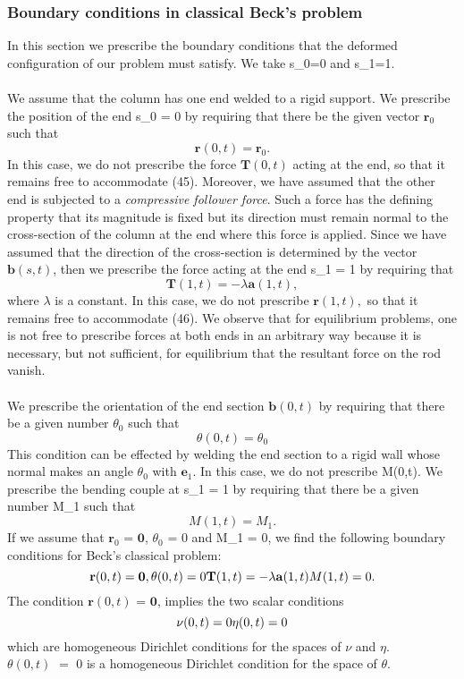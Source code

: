 
\subsubsection{Boundary conditions in classical Beck's problem}
In this section we prescribe the boundary conditions that the deformed configuration of our problem must satisfy. We take s_0=0 and s_1=1.\\\\
We assume that the column has one end welded to a rigid support. We prescribe the position of the end s_0 = 0 by requiring that there be the given vector $\mathbf{r}_0$ such that
\[ \mathbf{r}(0,t) = \mathbf{r}_0.\]
In this case, we do not prescribe the force $\mathbf{T}(0,t)$ acting at the end, so that it remains free to accommodate (45). Moreover, we have assumed that the other end is subjected to a \emph{compressive follower force}. Such a force has the defining property that its magnitude is fixed but its direction must remain normal to the cross-section of the column at the end where this force is applied. Since we have assumed that the direction of the cross-section is determined by the vector $\mathbf{b}(s,t)$, then we prescribe the force acting at the end s_1 = 1 by requiring that 
\[ \mathbf{T}(1,t) = -\lambda \mathbf{a}(1,t), \]
where $\lambda$ is a constant. In this case, we do not prescribe $\mathbf{r}(1,t),$ so that it remains free to accommodate (46). We observe that for equilibrium problems, one is not free to prescribe forces at both ends in an arbitrary way because it is necessary, but not sufficient, for equilibrium that the resultant force on the rod vanish.
\\\\
We prescribe the orientation of the end section $\mathbf{b}(0,t)$ by requiring that there be a given number $\theta_0$ such that
\[
\theta(0,t)=\theta_0
\]
This condition can be effected by welding the end section to a rigid wall whose normal makes an angle $\theta_0$ with $\mathbf{e}_1$. In this case, we do not prescribe M(0,t).
We prescribe the bending couple at s_1 = 1 by requiring that there be a given number M_1 such that
\[ M(1,t) = M_1.\]
If we assume that $\mathbf{r}_0$ = $\mathbf{0}$, $\theta_0$ = 0 and M_1 = 0, we find the following boundary conditions for Beck's classical problem:
\[ 
\mathbf{r}(0,t) = \mathbf{0},\\
\theta(0,t) = 0\\
\mathbf{T}(1,t) = -\lambda \mathbf{a}(1,t)\\
M(1,t) = 0.
\]
The condition $\mathbf{r}(0,t)$ = $\mathbf{0}$, implies the two scalar conditions
\[
\nu(0,t)= 0\\
\eta(0,t)= 0
\]
which are homogeneous Dirichlet conditions for the spaces of $\nu$ and $\eta$. $\theta(0,t)\,\,=\,\,0$ is a homogeneous Dirichlet condition for the space of $\theta$.
